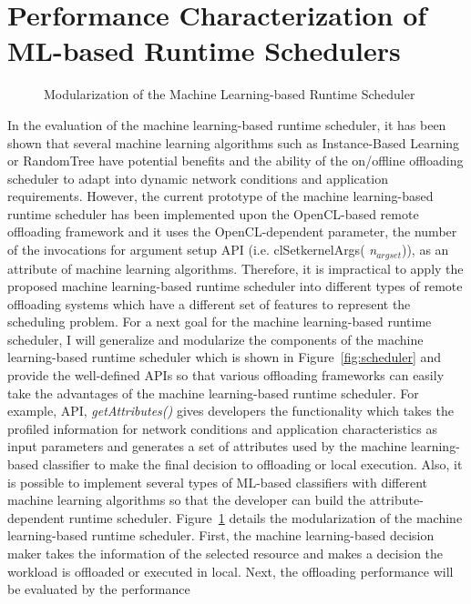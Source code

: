\section{Performance Characterization of ML-based Runtime Schedulers}
\label{summary:scheduler}
%
\begin{figure}
\centering
{}
\caption{Modularization of the Machine Learning-based Runtime Scheduler}
\label{fig:mlscheduler}
\end{figure}
%
In the evaluation of the machine learning-based runtime scheduler, it
has been shown that several machine learning algorithms such as
Instance-Based Learning or RandomTree have potential benefits and the
ability of the on/offline offloading scheduler to adapt into dynamic
network conditions and application requirements.
%
However, the current prototype of the machine learning-based runtime
scheduler has been implemented upon the OpenCL-based remote offloading
framework and it uses the OpenCL-dependent parameter, the number of the
invocations for argument setup API (i.e. clSetkernelArgs({\it
n$_{argset}$})), as an
attribute of machine learning algorithms.
%
Therefore, it is impractical to apply the proposed machine
learning-based runtime scheduler into different types of remote
offloading systems which have a different set of features to represent
the scheduling problem.
%
For a next goal for the machine learning-based runtime scheduler, I will
generalize and modularize the components of the machine learning-based
runtime scheduler which is shown in Figure~\ref{fig:scheduler} and
provide the well-defined APIs so that various offloading frameworks can
easily take the advantages of the machine learning-based runtime
scheduler.
%
For example, API, {\it getAttributes()} gives developers the
functionality which takes the profiled information for network
conditions and application characteristics as input parameters and
generates a set of attributes used by the machine learning-based
classifier to make the final decision to offloading or local execution.
%
Also, it is possible to implement several types of ML-based classifiers
with different machine learning algorithms so that the developer can
build the attribute-dependent runtime scheduler.
%
Figure~\ref{fig:mlscheduler} details the modularization of the machine
learning-based runtime scheduler.
%
First, the machine learning-based decision maker takes the information
of the selected resource and makes a decision the workload is offloaded
or executed in local.
%
Next, the offloading performance will be evaluated by the performance
